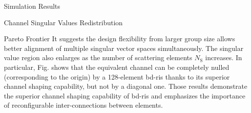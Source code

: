 \begin{section}{Simulation Results}
\begin{subsection}{Channel Singular Values Redistribution}
\begin{subsubsection}{Pareto Frontier}
		 It suggests the design flexibility from larger group size allows better alignment of multiple singular vector spaces simultaneously.
		 The singular value region also enlarges as the number of scattering elements $N_\mathrm{S}$ increases.
		 In particular, Fig.  shows that the equivalent channel can be completely nulled (corresponding to the origin) by a 128-element \gls{bd}-\gls{ris} thanks to its superior channel shaping capability, but not by a diagonal one.
		 Those results demonstrate the superior channel shaping capability of \gls{bd}-\gls{ris} and emphasizes the importance of reconfigurable inter-connections between elements.
	 \end{subsubsection}


\end{subsection}
\end{section}
